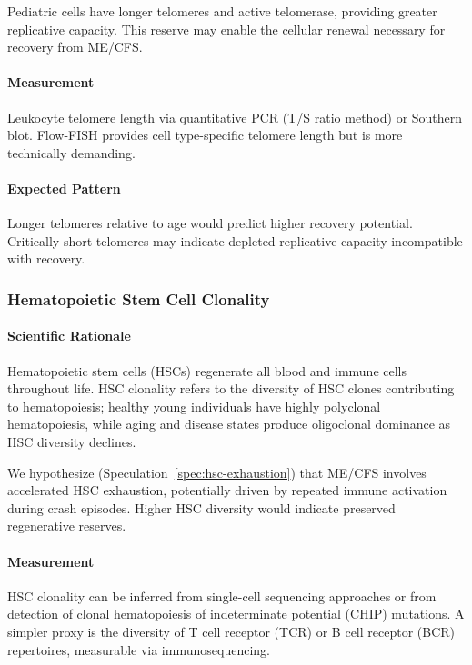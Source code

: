 Pediatric cells have longer telomeres and active telomerase, providing greater replicative capacity. This reserve may enable the cellular renewal necessary for recovery from ME/CFS.

\paragraph{Measurement}
Leukocyte telomere length via quantitative PCR (T/S ratio method) or Southern blot. Flow-FISH provides cell type-specific telomere length but is more technically demanding.

\paragraph{Expected Pattern}
Longer telomeres relative to age would predict higher recovery potential. Critically short telomeres may indicate depleted replicative capacity incompatible with recovery.

\subsubsection{Hematopoietic Stem Cell Clonality}

\paragraph{Scientific Rationale}
Hematopoietic stem cells (HSCs) regenerate all blood and immune cells throughout life. HSC clonality refers to the diversity of HSC clones contributing to hematopoiesis; healthy young individuals have highly polyclonal hematopoiesis, while aging and disease states produce oligoclonal dominance as HSC diversity declines.

We hypothesize (Speculation~\ref{spec:hsc-exhaustion}) that ME/CFS involves accelerated HSC exhaustion, potentially driven by repeated immune activation during crash episodes. Higher HSC diversity would indicate preserved regenerative reserves.

\paragraph{Measurement}
HSC clonality can be inferred from single-cell sequencing approaches or from detection of clonal hematopoiesis of indeterminate potential (CHIP) mutations. A simpler proxy is the diversity of T cell receptor (TCR) or B cell receptor (BCR) repertoires, measurable via immunosequencing.

